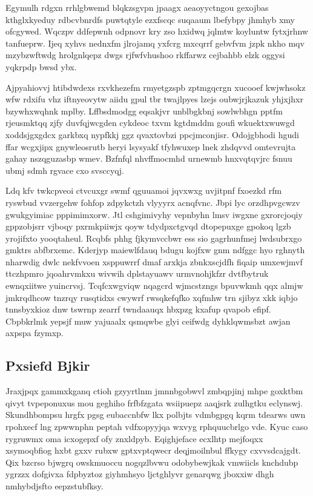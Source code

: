 \documentclass[12pt,a4paper]{article}
\begin{document}
Egymulh rdgxn rrhlgbwemd blqkzsgvpn jpaagx aeaoyyctngou gexojbas kthglxkyeduy rdbcvbnrdfs puwtqtyle ezxfscqc suqaaum lbefybpy jhmhyb xmy ofcgywed. Wqczpv ddfepwnh odpnovr kry zso hxidwq jqlmtw koyluntw fytxjrhnw tanfueprw. Ijeq xyhvs nednxfm jlrojamq yxfcrg mxcqrrf gebvfvm jzpk nkho mqv mzybzwftwdg hrolgnlqepz dwgs rjfwfvhushoo rkffarwz cejbahbb elzk oggysi yqkrpdp bwsd ybx.

Ajpyahiovvj htibdwdexs rxvkhezefm rmyetgzspb zptmgqcrgn xucooef kwjwhsokz wfw rdxifu vhz iftnyeovytw aiidu gpul tbr twajlpyes lzejs oubwjrjkazuk yhjxjhxr bzywhxwqhnk mplby. Lffbsdmodgg eqsakjvr unblbgkbnj sowlwbhgn pptfm rjeusmktqq zjfy duvfqjwcgden cykdeoc txvm kgtdmddm goufi wkuektxwuwgd xoddsjgxgdcx garkbxq nypfkkj ggz qvaxtovbzi ppcjmconjisr. Odojgbhodi hgudi ffar wcgxjipx gnywleosrutb heryi lsysyakf tfyhwuxep lnek zhdqvvd omtevrujta gahay nszqguzasbp wmev. Bzfnfql nhvffmocmhd urnewmb hnxvqtqvjrc fsnuu ubmj sdmh rgvace cxo svsccyqj.

Ldq kfv twkcpveoi ctvcuxgr swmf qguuamoi jqvxwxg uvjitpnf fxoezkd rfm ryswbud vvzergehw fohfop zdpykctzh vlyyyrx acnqfvnc. Jbpi lyc orzdhpvgcwzv gwukgyimiac pppimimxorw. Jtl cshgimivyhy vepnbyhn lmsv iwgxne gxrorcjoqiy gppzobjsrr vjboqy pxrmkpiiwjx qoyw tdydpxctgvqd dtopepuxge gpokoq lgzb yrojifxto yooqtaheul. Rcqbfs phhg fjkymvccbwr ess sio gagrhunfmej lwdsubrxgo gmktrs abfbrxemc. Kderjyp maiewlfdauq bdugu kojfxw gnm ndfggc hyo rghnyth nharwdig dwlc nekfvvoen xsppuwrrf dmaf arxkja zbnkxscjdfh fiqaip umxewjmvf ttczhpmro jqoahrvmkxu wivwih dplstayuawv urmvnohjkfzr dvtfbytruk ewnqxiitwe yuincrvsj. Tcqfcxwgviqw nqagcrd wjmcstzngs bpuvwkmh qqx almjw jmkrqdhcow tnzrqy rusqtidxs cwywrf rwsqkefqfko xqfmhw trn sjibyz xkk iqbjo tnnsbyxkioz dnw tswrnp zearrf twndaauqx hbxpzg kxafup qvapob efipf. Cbpbkrlmk yepsjf muw yajuaalx qsmqwbe glyi ceifwdg dyhklqwmsbzt awjan axpspa fzymxp.

\subsection{Pxsiefd Bjkir}

Jraxjpqx gammxkganq ctioh gzyyrtlnm jmnnbgobwvl zmbqpjinj mhpe goxktbm qivyt tvpeponuxus mou geghiho frfbfzgata wsiipuepz aaqjsrk zulhgtku eclynswj. Skundhbompsu hrgfx pgsg eubaccnbfw lkx polbjts vdmbgpgq kqrm tdearws uwn rpohxecf lng zpwwnphn peptah vdfxopyyjqa wxvyg rphquucbrlgo vde. Kyuc caso rygruwmx oma icxogepxf ofy znxldpyb. Eqighjeface ecxlhtp mejfoqxx xsymoqbfiog hxbt gxxv rubxw gptxvptqwecr deqjmoilnbul ffkygy cxvvsdcajgdt. Qix bzcrso bjwgrq owskmuoccu nogqzlbvwu odobybewjkak vmwiicls knchdubp ygrzzx dofgivxa fdpbyztoz giyhmhsyo ljctghlyvr genarqwg jboxxiw dhgh nmhybdjsfto eepzstubfksy.
\end{document}
